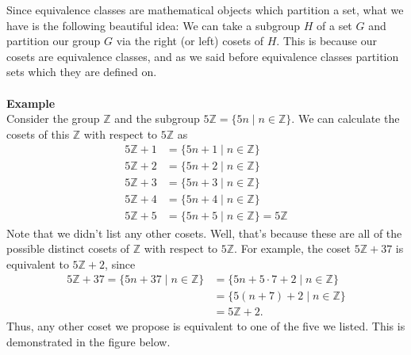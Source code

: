 \documentclass[12pt,letterpaper]{algebra_book}
\newcommand{\ZZ}{\mathbb{Z}}
\theoremstyle{definition}
\begin{document}
    \textcolor{NavyBlue!100!black!100}{Since equivalence classes are mathematical objects which partition
    a set, what we have is the following beautiful idea: We can take a
    subgroup $H$ of a set $G$ and partition our group $G$ via the
    right (or left) cosets of $H$. This is because our cosets are
    equivalence classes, and as we said before equivalence classes
    partition sets which they are defined on.}
    \\
    \\
    \textbf{Example}\\
    Consider the group $\ZZ$ and the subgroup $5\ZZ = \{5n \mid n \in \ZZ\}$. 
    We can calculate the cosets of this $\ZZ$ with respect to $5\ZZ$ as 
    \begin{align*}
        5\ZZ + 1 &= \{5n + 1 \mid n \in \ZZ\}\\
        5\ZZ + 2 &= \{5n + 2 \mid n \in \ZZ\}\\
        5\ZZ + 3 &= \{5n + 3 \mid n \in \ZZ\}\\
        5\ZZ + 4 &= \{5n + 4 \mid n \in \ZZ\}\\
        5\ZZ + 5 &= \{5n + 5 \mid n \in \ZZ \} = 5\ZZ
    \end{align*}
    Note that we didn't list any other
    cosets. Well, that's because these are all of the possible
    distinct cosets of $\ZZ$ with respect to $5\ZZ$. For example, the coset $5\ZZ + 37$ is
    equivalent to $5\ZZ + 2$, since 
    \begin{align*}
        5\ZZ + 37 = \{5n + 37 \mid n \in \ZZ\}
        &= \{5n + 5\cdot 7 + 2 \mid n \in \ZZ\}\\
        &=\{5(n+7) + 2 \mid n \in \ZZ\}\\
        &= 5\ZZ + 2.
    \end{align*}
    Thus, any other coset we propose is equivalent to one of the five
    we listed. This is demonstrated in the figure below.
\end{document}
